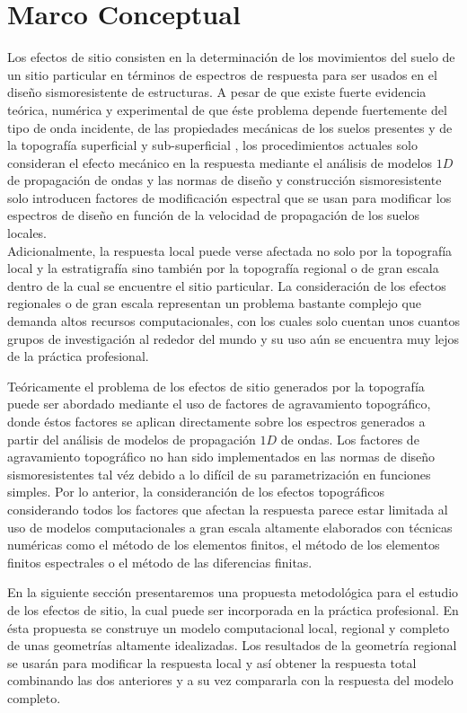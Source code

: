 \documentclass[spanish,letterpaper,12pt,twoside,openany]{article}
\begin{document}
\section{Marco Conceptual}
%
Los efectos de sitio consisten en la determinación de los movimientos del suelo de un sitio particular en términos de espectros de respuesta para ser usados en el diseño sismoresistente de estructuras. A pesar de que existe fuerte evidencia teórica, numérica y experimental de que éste problema depende fuertemente del tipo de onda incidente, de las propiedades mecánicas de los suelos presentes y de la topografía superficial y sub-superficial \citep[por ejemplo en][]{Assimaki2013, Ashford1997, Aki1993, Barani2014}, los procedimientos actuales solo consideran el efecto mecánico en la respuesta mediante el análisis de modelos $1D$ de propagación de ondas  y las normas de diseño y construcción sismoresistente solo introducen factores de modificación espectral que se usan para modificar los espectros de diseño en función de la velocidad de propagación de los suelos locales.\\
%
Adicionalmente, la respuesta local puede verse afectada no solo por la topografía local y la estratigrafía sino también por la topografía regional o de gran escala dentro de la cual se encuentre el sitio particular. La consideración de los efectos regionales o de gran escala representan un problema bastante complejo que demanda altos recursos computacionales, con los cuales solo cuentan unos cuantos grupos de investigación al rededor del mundo \citep[ver][]{Doriam2014, Graves2011} y su uso aún se encuentra muy lejos de la práctica profesional.

Teóricamente el problema de los efectos de sitio generados por la topografía puede ser abordado mediante el uso de factores de agravamiento topográfico, donde éstos factores se aplican directamente sobre los espectros generados a partir del análisis de modelos de propagación $1D$ de ondas. Los factores de agravamiento topográfico no han sido implementados en las normas de diseño sismoresistentes tal véz debido a lo difícil de su parametrización en funciones simples. Por lo anterior, la consideranción de los efectos topográficos considerando todos los factores que afectan la respuesta parece estar limitada al uso de modelos computacionales a gran escala altamente elaborados con técnicas numéricas como el método de los elementos finitos, el método de los elementos finitos espectrales o el método de las diferencias finitas.

En la siguiente sección presentaremos una propuesta metodológica para el estudio de los efectos de sitio, la cual puede ser incorporada en la práctica profesional. En ésta propuesta se construye un modelo computacional local, regional y completo de unas geometrías altamente idealizadas. Los resultados de la geometría regional se usarán para modificar la respuesta local y así obtener la respuesta total combinando las dos anteriores y a su vez compararla con la respuesta del modelo completo.
\end{document}

